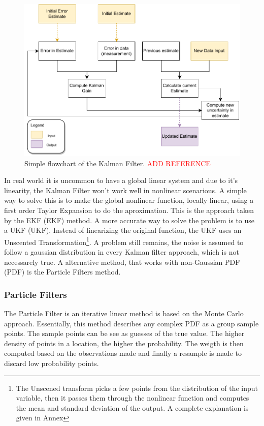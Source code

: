 \begin{figure}[H]
    \centering
    \includegraphics[width=0.6\linewidth]{images/background/Kalman-diagram.pdf}
    \caption{Simple flowchart of the Kalman Filter. \textcolor{red}{ADD REFERENCE}}
    \label{fig: flowchart kalman}
\end{figure}

In real world it is uncommon to have a global linear system and due to it's linearity, the Kalman Filter won't work well in nonlinear scenarious. A simple way to solve this is to make the global nonlinear function, locally linear, using a first order Taylor Expansion to do the aproximation. This is the approach taken by the \acl{EKF} (\acs*{EKF}) method. A more accurate way to solve the problem is to use a \acl*{UKF} (\acs*{UKF}). Instead of linearizing the original function, the \acs*{UKF} uses an Unscented Transformation\footnote{The Unscened transform picks a few points from the distribution of the input variable, then it passes them through the nonlinear function and computes the mean and standard deviation of the output. A complete explanation is given in Annex}. A problem still remains, the noise is assumed to follow a gaussian distribution in every Kalman filter approach, which is not necessarely true. A alternative method, that works with non-Gaussian \acl*{PDF} (\acs*{PDF}) is the Particle Filters method.

\subsubsection{Particle Filters}

The Particle Filter is an iterative linear method is based on the Monte Carlo approach. Essentially, this method describes any complex \acs*{PDF} as a group sample points. The sample points can be see as guesses of the true value. The higher density of points in a location, the higher the probability. The weigth is then computed based on the observations made and finally a resample is made to discard low probability points.

